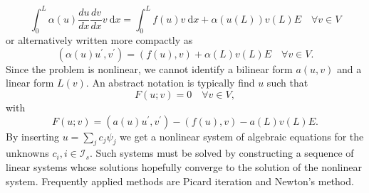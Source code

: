 \documentclass[../main.tex]{subfiles}
\begin{document}
		$$
		\int_{0}^{L} \alpha(u) \frac{d u}{d x} \frac{d v}{d x} v \mathrm{~d} x=\int_{0}^{L} f(u) v \mathrm{~d} x+\alpha(u(L)) v(L) E \quad \forall v \in V
		$$
		or alternatively written more compactly as
		$$
		\left(\alpha(u) u^{\prime}, v^{\prime}\right)=(f(u), v)+\alpha(L) v(L) E \quad \forall v \in V .
		$$
		Since the problem is nonlinear, we cannot identify a bilinear form $a(u, v)$ and a linear form $L(v)$. An abstract notation is typically find $u$ such that
		$$
		F(u ; v)=0 \quad \forall v \in V,
		$$
		with
		$$
		F(u ; v)=\left(a(u) u^{\prime}, v^{\prime}\right)-(f(u), v)-a(L) v(L) E .
		$$
		By inserting $u=\sum_{j} c_{j} \psi_{j}$ we get a nonlinear system of algebraic equations for the unknowns $c_{i}, i \in \mathcal{I}_{s}$. Such systems must be solved by constructing a sequence of linear systems whose solutions hopefully converge to the solution of the nonlinear system. Frequently applied methods are Picard iteration and Newton's method.\bigbreak 
	
\end{document}
